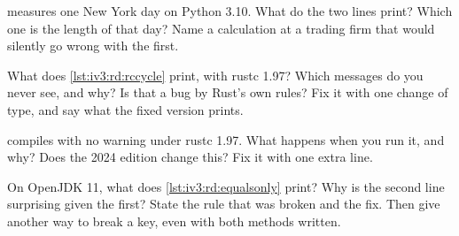 \begin{question}\label{iq:iv3:reading-debugging-and-software-design:20}
 measures one New York day on Python 3.10. What do the two lines print? Which one is the length of that day? Name a calculation at a trading firm that would silently go wrong with the first.
\label{lst:iv3:rd:dst}
\end{question}

\begin{question}\label{iq:iv3:reading-debugging-and-software-design:21}
What does \cref{lst:iv3:rd:rccycle} print, with rustc 1.97? Which messages do you never see, and why? Is that a bug by Rust's own rules? Fix it with one change of type, and say what the fixed version prints.
\label{lst:iv3:rd:rccycle}
\end{question}

\begin{question}\label{iq:iv3:reading-debugging-and-software-design:22}
 compiles with no warning under rustc 1.97. What happens when you run it, and why? Does the 2024 edition change this? Fix it with one extra line.
\label{lst:iv3:rd:guardmatch}
\end{question}

\begin{question}\label{iq:iv3:reading-debugging-and-software-design:23}
On OpenJDK 11, what does \cref{lst:iv3:rd:equalsonly} print? Why is the second line surprising given the first? State the rule that was broken and the fix. Then give another way to break a key, even with both methods written.
\label{lst:iv3:rd:equalsonly}
\end{question}

